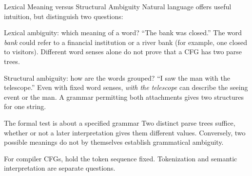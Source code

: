 \documentclass[10pt]{beamer}
\begin{document}
\begin{frame}{Lexical Meaning versus Structural Ambiguity}
  \small
  Natural language offers useful intuition, but distinguish two questions:
  \begin{block}{Lexical ambiguity: which meaning of a word?}
    ``The bank was closed.'' The word \emph{bank} could refer to a financial
    institution or a river bank (for example, one closed to visitors).
    Different word senses alone do not prove that a CFG has two parse trees.
  \end{block}
  \pause
  \begin{block}{Structural ambiguity: how are the words grouped?}
    ``I saw the man with the telescope.'' Even with fixed word senses,
    \emph{with the telescope} can describe the seeing event or the man.
    A grammar permitting both attachments gives two structures for one string.
  \end{block}
  \pause
  \begin{alertblock}{The formal test is about a specified grammar}
    Two distinct parse trees suffice, whether or not a later interpretation
    gives them different values. Conversely, two possible meanings do not
    by themselves establish grammatical ambiguity.
  \end{alertblock}
  For compiler CFGs, hold the token sequence fixed. Tokenization and
  semantic interpretation are separate questions.
\end{frame}
\end{document}
